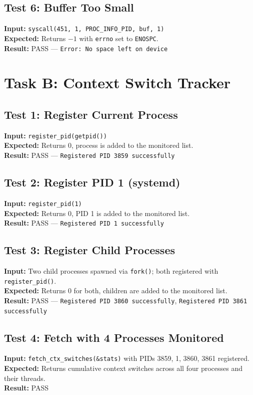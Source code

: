 \documentclass[12pt,a4paper]{article}
\begin{document}
\subsection*{Test 6: Buffer Too Small}
\textbf{Input:} \texttt{syscall(451, 1, PROC\_INFO\_PID, buf, 1)} \\
\textbf{Expected:} Returns $-1$ with \texttt{errno} set to \texttt{ENOSPC}. \\
\textbf{Result:} PASS --- \texttt{Error: No space left on device}

\section*{Task B: Context Switch Tracker}

\subsection*{Test 1: Register Current Process}
\textbf{Input:} \texttt{register\_pid(getpid())} \\
\textbf{Expected:} Returns 0, process is added to the monitored list. \\
\textbf{Result:} PASS --- \texttt{Registered PID 3859 successfully}

\subsection*{Test 2: Register PID 1 (systemd)}
\textbf{Input:} \texttt{register\_pid(1)} \\
\textbf{Expected:} Returns 0, PID 1 is added to the monitored list. \\
\textbf{Result:} PASS --- \texttt{Registered PID 1 successfully}

\subsection*{Test 3: Register Child Processes}
\textbf{Input:} Two child processes spawned via \texttt{fork()}; both registered with \texttt{register\_pid()}. \\
\textbf{Expected:} Returns 0 for both, children are added to the monitored list. \\
\textbf{Result:} PASS --- \texttt{Registered PID 3860 successfully}, \texttt{Registered PID 3861 successfully}

\subsection*{Test 4: Fetch with 4 Processes Monitored}
\textbf{Input:} \texttt{fetch\_ctx\_switches(\&stats)} with PIDs 3859, 1, 3860, 3861 registered. \\
\textbf{Expected:} Returns cumulative context switches across all four processes and their threads. \\
\textbf{Result:} PASS
\end{document}
